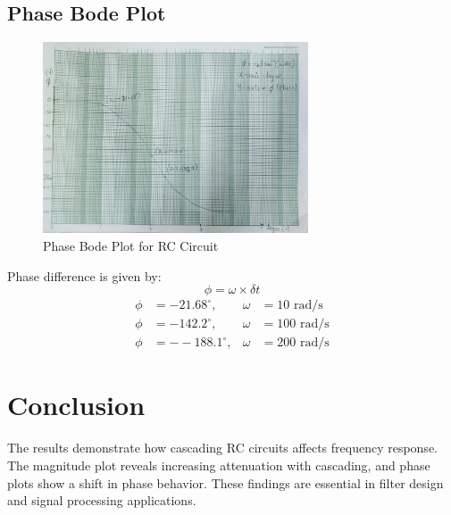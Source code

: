\documentclass[a4paper,12pt]{article}
\begin{document}
\subsection{Phase Bode Plot}
\begin{figure}[H]
    \centering
    \includegraphics[width=0.7\textwidth]{fig/pbd3.jpeg} %
    \caption{Phase Bode Plot for RC Circuit}
\end{figure}
Phase difference is given by:
$$\phi = \omega \times \delta t$$
\begin{align}
\phi &= -21.68^\circ, & \omega &= 10 \text{ rad/s} \\
\phi &= -142.2^\circ, & \omega &= 100 \text{ rad/s} \\
\phi &= --188.1^\circ, & \omega &= 200 \text{ rad/s}
\end{align}


\section{Conclusion}
The results demonstrate how cascading RC circuits affects frequency response. The magnitude plot reveals increasing attenuation with cascading, and phase plots show a shift in phase behavior. These findings are essential in filter design and signal processing applications.
\end{document}
